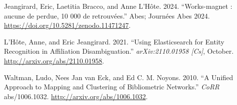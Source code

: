 \documentclass[
]{article}
\newlength{\cslhangindent}
\newenvironment{cslreferences}%
  {\setlength{\parindent}{0pt}%
  \everypar{\setlength{\hangindent}{\cslhangindent}}\ignorespaces}%
  {\par}
\begin{document}
\begin{cslreferences}
\leavevmode\hypertarget{ref-jeangirard:hal-04598201}{}%
Jeangirard, Eric, Laetitia Bracco, and Anne L'Hôte. 2024. ``Works-magnet
: aucune de perdue, 10 000 de retrouvées.'' Abes; Journées Abes 2024.
\url{https://doi.org/10.5281/zenodo.11471247}.

\leavevmode\hypertarget{ref-lhote_using_2021}{}%
L'Hôte, Anne, and Eric Jeangirard. 2021. ``Using Elasticsearch for
Entity Recognition in Affiliation Disambiguation.''
\emph{arXiv:2110.01958 {[}Cs{]}}, October.
\url{http://arxiv.org/abs/2110.01958}.

\leavevmode\hypertarget{ref-DBLP:journalsux2fcorrux2fabs-1006-1032}{}%
Waltman, Ludo, Nees Jan van Eck, and Ed C. M. Noyons. 2010. ``A Unified
Approach to Mapping and Clustering of Bibliometric Networks.''
\emph{CoRR} abs/1006.1032. \url{http://arxiv.org/abs/1006.1032}.
\end{cslreferences}
\end{document}
